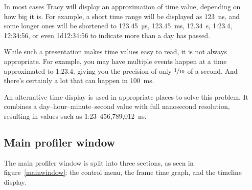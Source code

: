 \documentclass[hidelinks,titlepage,a4paper,twoside]{article}
\begin{document}
In most cases Tracy will display an approximation of time value, depending on how big it is. For example, a short time range will be displayed as 123~\si{\nano\second}, and some longer ones will be shortened to 123.45~\si{\micro\second}, 123.45~\si{\milli\second}, 12.34~\si{\second}, 1:23.4, 12:34:56, or even 1d12:34:56 to indicate more than a day has passed.

While such a presentation makes time values easy to read, it is not always appropriate. For example, you may have multiple events happen at a time approximated to 1:23.4, giving you the precision of only $\sfrac{1}{10}$ of a second. And there's certainly a lot that can happen in 100~\si{\milli\second}.

An alternative time display is used in appropriate places to solve this problem. It combines a day--hour--minute--second value with full nanosecond resolution, resulting in values such as 1:23~456,789,012~\si{\nano\second}.

\subsection{Main profiler window}

The main profiler window is split into three sections, as seen in figure~\ref{mainwindow}: the control menu, the frame time graph, and the timeline display.
\end{document}
